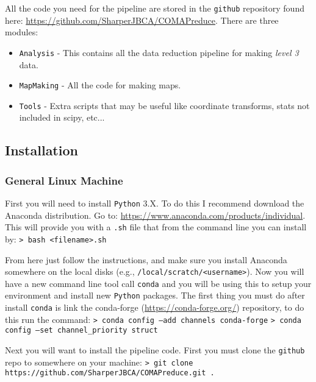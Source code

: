 \documentclass[11pt]{article}
\begin{document}
All the code you need for the pipeline are stored in the \texttt{github} repository found here: \url{https://github.com/SharperJBCA/COMAPreduce}. There are three modules:
\begin{itemize}
  \item \texttt{Analysis} - This contains all the data reduction pipeline for making \textit{level 3} data.
  \item \texttt{MapMaking} - All the code for making maps.
  \item \texttt{Tools} - Extra scripts that may be useful like coordinate transforms, stats not included in scipy, etc...
\end{itemize}

\subsection{Installation}

\subsubsection{General Linux Machine}

First you will need to install \texttt{Python} 3.X. To do this I recommend download the Anaconda distribution. Go to: \url{https://www.anaconda.com/products/individual}. This will provide you with a \texttt{.sh} file that from the command line you can install by:
\newline\noindent
\texttt{> bash <filename>.sh}
\newline\noindent

From here just follow the instructions, and make sure you install Anaconda somewhere on the local disks (e.g., \texttt{/local/scratch/<username>}). 
\newline
\noindent
Now you will have a new command line tool call \texttt{conda} and you will be using this to setup your environment and install new \texttt{Python} packages. The first thing you must do after install \texttt{conda} is link the conda-forge (\url{https://conda-forge.org/}) repository, to do this run the command:
\newline\noindent
\texttt{> conda config --add channels conda-forge}
\newline\noindent
\texttt{> conda config --set channel\_priority struct}
\newline\noindent

Next you will want to install the pipeline code. First you must clone the \texttt{github} repo to somewhere on your machine:
\newline\noindent
\texttt{> git clone https://github.com/SharperJBCA/COMAPreduce.git .}
\newline\noindent
\end{document}
